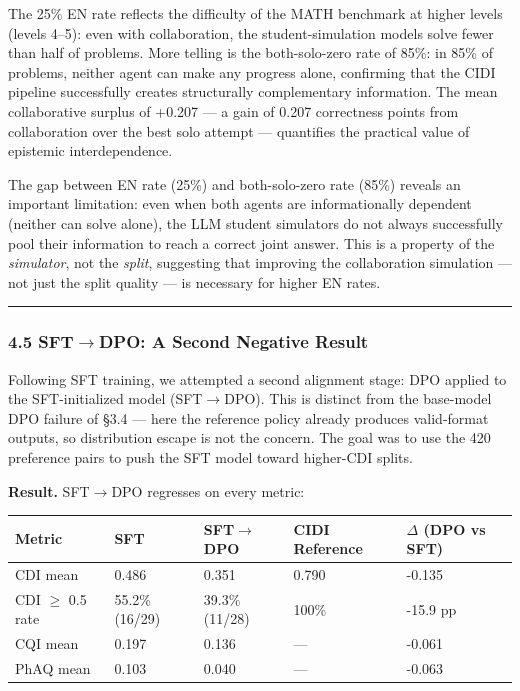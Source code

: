 \documentclass[
  11pt,
]{article}
\newcounter{none} %
\begin{document}
The 25\% EN rate reflects the difficulty of the MATH benchmark at higher
levels (levels 4--5): even with collaboration, the student-simulation
models solve fewer than half of problems. More telling is the
both-solo-zero rate of 85\%: in 85\% of problems, neither agent can make
any progress alone, confirming that the CIDI pipeline successfully
creates structurally complementary information. The mean collaborative
surplus of +0.207 --- a gain of 0.207 correctness points from
collaboration over the best solo attempt --- quantifies the practical
value of epistemic interdependence.

The gap between EN rate (25\%) and both-solo-zero rate (85\%) reveals an
important limitation: even when both agents are informationally
dependent (neither can solve alone), the LLM student simulators do not
always successfully pool their information to reach a correct joint
answer. This is a property of the \emph{simulator}, not the
\emph{split}, suggesting that improving the collaboration simulation ---
not just the split quality --- is necessary for higher EN rates.

\begin{center}\rule{0.5\linewidth}{0.5pt}\end{center}

\subsubsection{4.5 SFT$\to$DPO: A Second Negative Result}\label{sft-dpo-second-negative}

Following SFT training, we attempted a second alignment stage: DPO applied to the SFT-initialized model (SFT$\to$DPO). This is distinct from the base-model DPO failure of \S3.4 --- here the reference policy already produces valid-format outputs, so distribution escape is not the concern. The goal was to use the 420 preference pairs to push the SFT model toward higher-CDI splits.

\textbf{Result.} SFT$\to$DPO regresses on every metric:

{\def\LTcaptype{none}
\begin{longtable}[]{@{}lllll@{}}
\toprule\noalign{}
Metric & SFT & SFT$\to$DPO & CIDI Reference & $\Delta$ (DPO vs SFT) \\
\midrule\noalign{}
\endhead
\bottomrule\noalign{}
\endlastfoot
CDI mean & 0.486 & 0.351 & 0.790 & -0.135 \\
CDI $\geq$ 0.5 rate & 55.2\% (16/29) & 39.3\% (11/28) & 100\% & -15.9 pp \\
CQI mean & 0.197 & 0.136 & --- & -0.061 \\
PhAQ mean & 0.103 & 0.040 & --- & -0.063 \\
\end{longtable}
}
\end{document}
